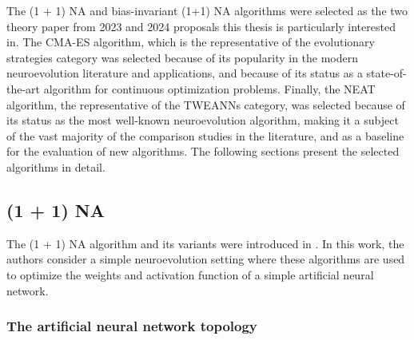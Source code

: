 The (1 + 1) NA and bias-invariant (1+1) NA algorithms were selected as the two theory paper from 2023 and 2024 proposals this thesis is particularly interested in.
The CMA-ES algorithm, which is the representative of the evolutionary strategies category was selected because of its popularity in the modern neuroevolution literature
and applications, and because of its status as a state-of-the-art algorithm for continuous optimization problems.
Finally, the NEAT algorithm, the representative of the TWEANNs category, was selected because of its status as the most well-known neuroevolution algorithm, making
it a subject of the vast majority of the comparison studies in the literature, and as a baseline for the evaluation of new algorithms.
The following sections present the selected algorithms in detail.

\subsection{(1 + 1) NA}

The (1 + 1) NA algorithm and its variants were introduced in \cite{na}.
In this work, the authors consider a simple neuroevolution setting where these algorithms are used to optimize the weights and activation function of
a simple artificial neural network.

\subsubsection{The artificial neural network topology}

